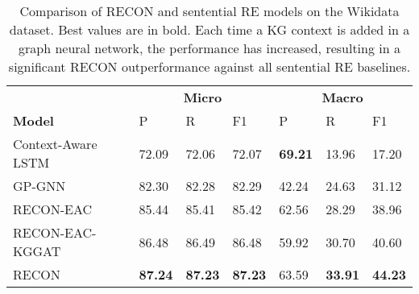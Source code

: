 \documentclass[sigconf]{acmart}
\begin{document}
\begin{table}[ht!]
 \small
    \centering
\begin{tabular}{p{3cm}|p{0.5cm}p{0.5cm}p{0.5cm}|p{0.5cm}p{0.5cm}p{0.5cm}}
\toprule
&\multicolumn{3}{c|}{\textbf{Micro}}& \multicolumn{3}{c}{\textbf{Macro}}\\
\textbf{Model} &P & R & F1  &P & R & F1 \\
\midrule
Context-Aware LSTM \cite{DBLP:conf/emnlp/SorokinG17} & 72.09 &72.06 &72.07 &\textbf{69.21} &13.96 &17.20 \\
GP-GNN \cite{DBLP:conf/acl/ZhuLLFCS19}& 82.30  &82.28  &82.29 & 42.24  & 24.63  & 31.12\\
\midrule
RECON-EAC  & 85.44 & 85.41 & 85.42 & 62.56 & 28.29 & 38.96\\
RECON-EAC-KGGAT & 86.48 &  86.49 & 86.48 & 59.92 & 30.70 & 40.60
    \\
RECON & \textbf{87.24} &  \textbf{87.23} & \textbf{87.23} & 63.59 & \textbf{33.91} & \textbf{44.23}
    \\
\bottomrule
 \end{tabular}
\caption{Comparison of RECON and sentential RE models on the Wikidata dataset. Best values are in bold. Each time a KG context is added in a graph neural network, the performance has increased, resulting in a significant RECON outperformance against all sentential RE baselines.}
\label{tab:results1}
   \vspace{-2mm}
\end{table}
\end{document}
